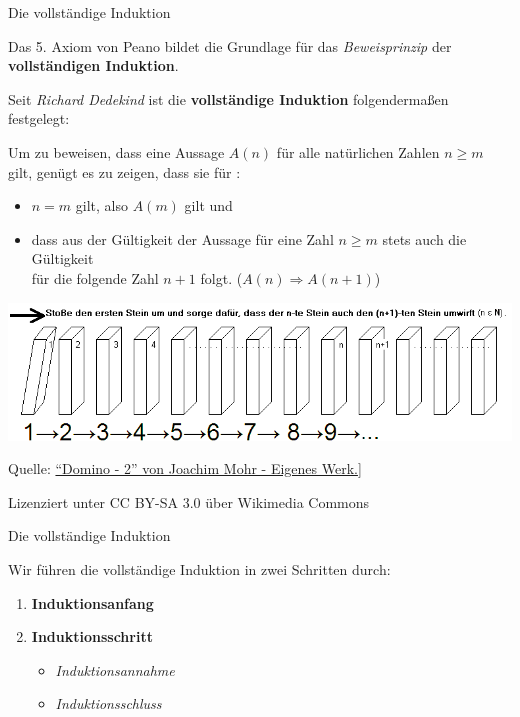 \documentclass[12pt,ngerman,a4paper,ignorenonframetext,]{beamer}
\providecommand{\tightlist}{%
  \setlength{\itemsep}{0pt}\setlength{\parskip}{0pt}}
\begin{document}
\begin{frame}{Die vollständige Induktion}
\protect\hypertarget{die-vollstandige-induktion}{}

Das 5. Axiom von Peano bildet die Grundlage für das \emph{Beweisprinzip}
der \textbf{vollständigen Induktion}.

Seit \emph{Richard Dedekind} ist die \textbf{vollständige Induktion}
folgendermaßen festgelegt:


\begin{definition}

Um zu beweisen, dass eine Aussage \(A(n)\) für alle natürlichen Zahlen
\(n \geq m\) gilt, genügt es zu zeigen, dass sie für :

\begin{itemize}
\tightlist
\item
  \(n = m\) gilt, also \(A(m)\) gilt und
\item
  dass aus der Gültigkeit der Aussage für eine Zahl \(n \geq m\) stets
  auch die Gültigkeit\\
  für die folgende Zahl \(n+1\) folgt. (\(A(n) \Longrightarrow A(n+1)\))
\end{itemize}

\end{definition}

\begin{center}\includegraphics[width=0.6\linewidth]{./images/MGWI/Domino} \end{center}

{\tiny{}

Quelle: \href{http://tinyurl.com/op2rhse}{``Domino - 2'' von Joachim
Mohr - Eigenes Werk.}{]}

Lizenziert unter CC BY-SA 3.0 über Wikimedia Commons

}

\end{frame}

\begin{frame}{Die vollständige Induktion}
\protect\hypertarget{die-vollstandige-induktion-1}{}

Wir führen die vollständige Induktion in zwei Schritten durch:

\begin{enumerate}
\item
  \glqq \textbf{Induktionsanfang}\grqq
\item
  \glqq \textbf{Induktionsschritt}\grqq

  \begin{itemize}
  \tightlist
  \item
    \glqq \textit{Induktionsannahme}\grqq
  \item
    \glqq \textit{Induktionsschluss}\grqq
  \end{itemize}
\end{enumerate}

\end{frame}
\end{document}
